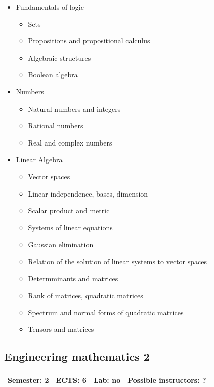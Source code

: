 \documentclass[12pt,twoside,fleqn,a4paper]{article}
\begin{document}
\begin{itemize}
\setlength\itemsep{0cm}
\item Fundamentals of logic
\begin{itemize}
    \item Sets
    \item Propositions and propositional calculus 
    \item Algebraic structures
    \item Boolean algebra
\end{itemize}
\item Numbers
\begin{itemize}
    \item Natural numbers and integers
    \item Rational numbers
    \item Real and complex numbers
\end{itemize}

\item Linear Algebra
\begin{itemize}
    \item Vector spaces
    \item Linear independence, bases, dimension
    \item Scalar product and metric
    \item Systems of linear equations
    \item Gaussian elimination
    \item Relation of the solution of linear systems to vector spaces
    \item Determminants and matrices
    \item Rank of matrices, quadratic matrices
    \item Spectrum and normal forms of quadratic matrices
    \item Tensors and matrices
\end{itemize}
\end{itemize}


\subsection{Engineering mathematics 2}
\begin{tabular}{llll} \hline
\textbf{Semester:} 2 & \textbf{ECTS:} 6 & \textbf{Lab:} no & \textbf{Possible instructors:} ?\\
\hline
\end{tabular}
\end{document}
